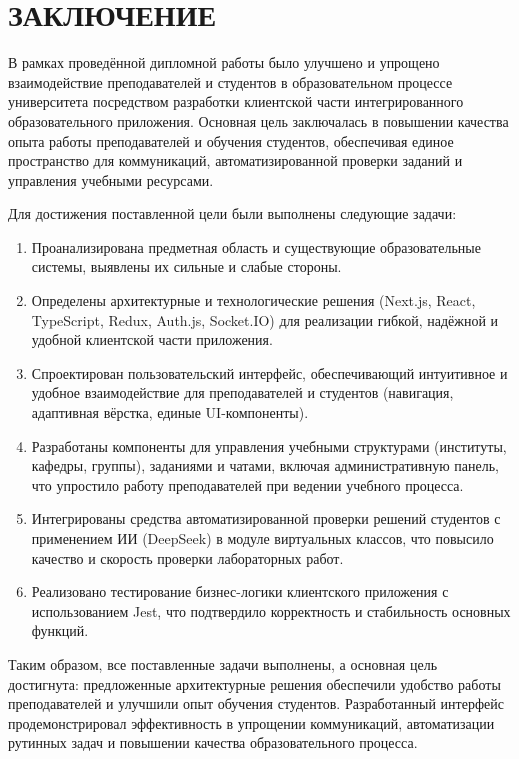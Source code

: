 \newpage
{}
\section*{ЗАКЛЮЧЕНИЕ}

В рамках проведённой дипломной работы было улучшено и упрощено взаимодействие преподавателей и студентов в образовательном процессе университета посредством разработки клиентской части интегрированного образовательного приложения. Основная цель заключалась в повышении качества опыта работы преподавателей и обучения студентов, обеспечивая единое пространство для коммуникаций, автоматизированной проверки заданий и управления учебными ресурсами.

Для достижения поставленной цели были выполнены следующие задачи:
\begin{enumerate}
  \item Проанализирована предметная область и существующие образовательные системы, выявлены их сильные и слабые стороны.
  \item Определены архитектурные и технологические решения (Next.js, React, TypeScript, Redux, Auth.js, Socket.IO) для реализации гибкой, надёжной и удобной клиентской части приложения.
  \item Спроектирован пользовательский интерфейс, обеспечивающий интуитивное и удобное взаимодействие для преподавателей и студентов (навигация, адаптивная вёрстка, единые UI-компоненты).
  \item Разработаны компоненты для управления учебными структурами (институты, кафедры, группы), заданиями и чатами, включая административную панель, что упростило работу преподавателей при ведении учебного процесса.
  \item Интегрированы средства автоматизированной проверки решений студентов с применением ИИ (DeepSeek) в модуле виртуальных классов, что повысило качество и скорость проверки лабораторных работ.
  \item Реализовано тестирование бизнес-логики клиентского приложения с использованием Jest, что подтвердило корректность и стабильность основных функций.
\end{enumerate}

Таким образом, все поставленные задачи выполнены, а основная цель достигнута: предложенные архитектурные решения обеспечили удобство работы преподавателей и улучшили опыт обучения студентов. Разработанный интерфейс продемонстрировал эффективность в упрощении коммуникаций, автоматизации рутинных задач и повышении качества образовательного процесса.

